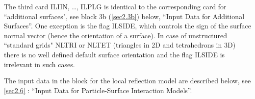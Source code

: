 The third card ILIIN, \dots, ILPLG is identical to the corresponding card for
``additional surfaces", see block 3b (\cref{sec2.3b}) below, ``Input Data for
Additional Surfaces''.
One exception is the flag ILSIDE, which controls the sign of the surface normal
vector (hence the orientation of a surface).
In case of unstructured ``standard grids" NLTRI or NLTET (triangles in 2D and
tetrahedrons in 3D) there is no well defined default surface orientation and
the flag ILSIDE is irrelevant in such cases.

\medskip

The input data in the block for the local reflection model are described below,
see \cref{sec2.6} : ``Input Data for Particle-Surface Interaction Models''.

